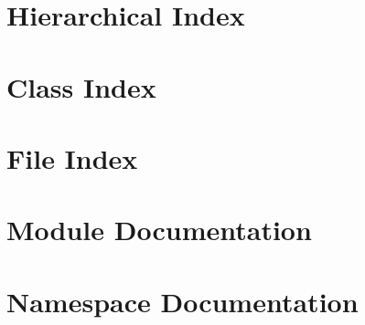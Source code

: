 \let\mypdfximage\pdfximage\def\pdfximage{\immediate\mypdfximage}\documentclass[twoside]{book}
\newcommand{\+}{\discretionary{\mbox{\scriptsize$\hookleftarrow$}}{}{}}
\begin{document}
\chapter{Hierarchical Index}

\chapter{Class Index}

\chapter{File Index}

\chapter{Module Documentation}






























































\chapter{Namespace Documentation}




\end{document}
